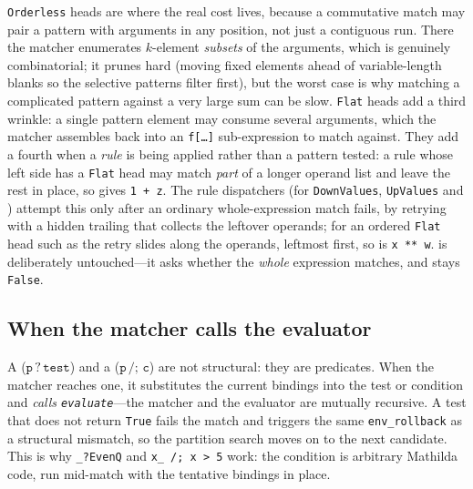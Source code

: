 \texttt{Orderless} heads are where the real cost lives, because a commutative match may
pair a pattern with arguments in any position, not just a contiguous run. There the
matcher enumerates \(k\)-element \emph{subsets} of the arguments, which is genuinely
combinatorial; it prunes hard (moving fixed elements ahead of variable-length blanks
so the selective patterns filter first), but the worst case is why matching a
complicated pattern against a very large sum can be slow. \texttt{Flat} heads add a
third wrinkle: a single pattern element may consume several arguments, which the
matcher assembles back into an \texttt{f[\dots]} sub-expression to match against.
They add a fourth when a \emph{rule} is being applied rather than a pattern tested: a
rule whose left side has a \texttt{Flat} head may match \emph{part} of a longer
operand list and leave the rest in place, so  gives
\texttt{1 + z}. The rule dispatchers (for
\texttt{DownValues}, \texttt{UpValues} and ) attempt this only after
an ordinary whole-expression match fails, by retrying with a hidden trailing
\mcode{\_\_\_} that collects the leftover operands; for an ordered \texttt{Flat} head
such as  the retry slides along the operands, leftmost
first, so  is \texttt{x ** w}.  is
deliberately untouched---it asks whether the \emph{whole} expression matches, and
 stays \texttt{False}.

\subsection*{When the matcher calls the evaluator}

A  (\(\mathtt{p\,?\,test}\)) and a 
(\(\mathtt{p\,/;\,c}\)) are not structural: they are predicates. When the matcher reaches one, it substitutes
the current bindings into the test or condition and \emph{calls
\texttt{evaluate}}---the matcher and the evaluator are mutually recursive. A test that
does not return \texttt{True} fails the match and triggers the same
\texttt{env\_rollback} as a structural mismatch, so the partition search moves on to
the next candidate. This is why \texttt{\_?EvenQ} and \texttt{x\_ /; x > 5} work: the
condition is arbitrary Mathilda code, run mid-match with the tentative bindings in
place.

